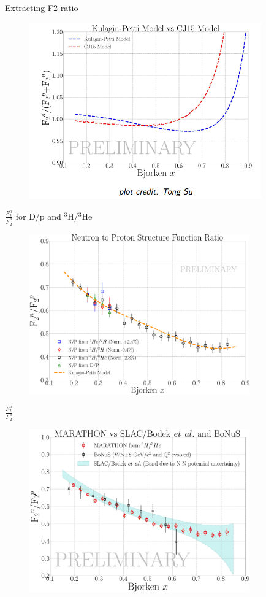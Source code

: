 \documentclass[12pt]{beamer}
\begin{document}
\begin{frame}{Extracting F2 ratio}
\vspace{-10pt}
\begin{figure}
	\includegraphics[width=10cm]{../images/kp_cj.png}
\end{figure}
\end{frame}


\begin{frame}{$\frac{F_2^n}{F_2^p}$ for D/p and $^3$H/$^3$He}
\vspace{-20pt}
\begin{figure}
	\includegraphics[width=9.5cm]{../images/MARA_F2_1.pdf}
\end{figure}
\end{frame}

\begin{frame}{$\frac{F_2^n}{F_2^p}$}
\vspace{-20pt}
\begin{figure}
	\includegraphics[width=9.5cm]{../images/MARA_F2.pdf}
\end{figure}
\end{frame}
\end{document}
